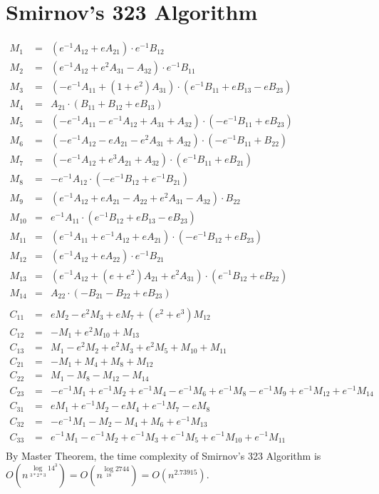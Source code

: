 \documentclass{article}
\begin{document}
\section{Smirnov's 323 Algorithm \cite{Smirnov13}}

\begin{eqnarray*}
M_1 &=& (e^{-1}A_{12} + eA_{21}) \cdot e^{-1}B_{12}\\
M_2 &=& (e^{-1}A_{12} + e^2A_{31} - A_{32}) \cdot e^{-1}B_{11}\\
M_3 &=& (-e^{-1}A_{11} + (1+e^2)A_{31}) \cdot (e^{-1}B_{11} + eB_{13} - eB_{23})\\
M_4 &=& A_{21} \cdot (B_{11} + B_{12} + eB_{13})\\
M_5 &=& (-e^{-1}A_{11} - e^{-1}A_{12} + A_{31} + A_{32}) \cdot (-e^{-1}B_{11} + eB_{23})\\
M_6 &=& (-e^{-1}A_{12} - eA_{21} - e^2A_{31} + A_{32}) \cdot (-e^{-1}B_{11} + B_{22})\\
M_7 &=& (-e^{-1}A_{12} + e^3A_{21} + A_{32}) \cdot (e^{-1}B_{11} + eB_{21})\\
M_8 &=& -e^{-1}A_{12} \cdot (-e^{-1}B_{12} + e^{-1}B_{21})\\
M_9 &=& (e^{-1}A_{12} + eA_{21} - A_{22} + e^2A_{31} - A_{32}) \cdot B_{22}\\
M_{10} &=& e^{-1}A_{11} \cdot (e^{-1}B_{12} + eB_{13} - eB_{23})\\
M_{11} &=& (e^{-1}A_{11} + e^{-1}A_{12} + eA_{21}) \cdot (-e^{-1}B_{12} + eB_{23})\\
M_{12} &=& (e^{-1}A_{12} + eA_{22}) \cdot e^{-1}B_{21}\\
M_{13} &=& (e^{-1}A_{12} + (e+e^2)A_{21} + e^2A_{31}) \cdot (e^{-1}B_{12} + eB_{22})\\
M_{14} &=& A_{22} \cdot (-B_{21} - B_{22} + eB_{23})\\\\
C_{11} &=& eM_2 - e^2M_3 + eM_7 + (e^2+e^3)M_{12}\\
C_{12} &=& -M_1 + e^2M_{10} + M_{13}\\
C_{13} &=& M_1 - e^2M_2 + e^2M_3 + e^2M_5 + M_{10} + M_{11}\\
C_{21} &=& -M_1 + M_4 + M_8 + M_{12}\\
C_{22} &=& M_1 - M_8 - M_{12} - M_{14}\\
C_{23} &=& -e^{-1}M_1 + e^{-1}M_2 + e^{-1}M_4 - e^{-1}M_6 + e^{-1}M_8 - e^{-1}M_9 + e^{-1}M_{12} + e^{-1}M_{14}\\
C_{31} &=& eM_1 + e^{-1}M_2 - eM_4 + e^{-1}M_7 - eM_8\\
C_{32} &=& -e^{-1}M_1 - M_2 - M_4 + M_6 + e^{-1}M_{13}\\
C_{33} &=& e^{-1}M_1 - e^{-1}M_2 + e^{-1}M_3 + e^{-1}M_5 + e^{-1}M_{10} + e^{-1}M_{11}\\
\end{eqnarray*}
By Master Theorem, the time complexity of Smirnov's 323 Algorithm is $O(n^{\log\limits_{3*2*3}14^3}) = O(n^{\log\limits_{18}2744}) = O(n^{2.73915})$.
\end{document}
